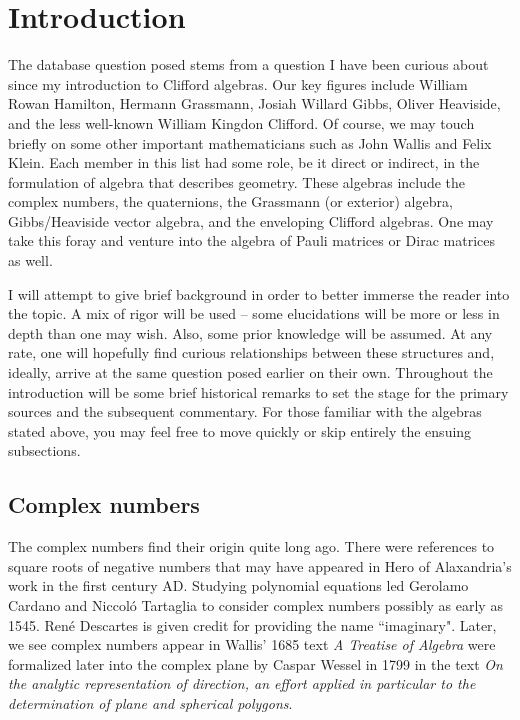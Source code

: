 \documentclass[12pt]{article}
\begin{document}
\section{Introduction}
The database question posed stems from a question I have been curious about since my introduction to Clifford algebras. Our key figures include William Rowan Hamilton, Hermann Grassmann, Josiah Willard Gibbs, Oliver Heaviside, and the less well-known William Kingdon Clifford. Of course, we may touch briefly on some other important mathematicians such as John Wallis and Felix Klein. Each member in this list had some role, be it direct or indirect, in the formulation of algebra that describes geometry. These algebras include the complex numbers, the quaternions, the Grassmann (or exterior) algebra, Gibbs/Heaviside vector algebra, and the enveloping Clifford algebras. One may take this foray and venture into the algebra of Pauli matrices or Dirac matrices as well.

I will attempt to give brief background in order to better immerse the reader into the topic. A mix of rigor will be used -- some elucidations will be more or less in depth than one may wish. Also, some prior knowledge will be assumed. At any rate, one will hopefully find curious relationships between these structures and, ideally, arrive at the same question posed earlier on their own. Throughout the introduction will be some brief historical remarks to set the stage for the primary sources and the subsequent commentary. For those familiar with the algebras stated above, you may feel free to move quickly or skip entirely the ensuing subsections. 

\subsection{Complex numbers}
The complex numbers find their origin quite long ago. There were references to square roots of negative numbers that may have appeared in Hero of Alaxandria's work in the first century AD. Studying polynomial equations led Gerolamo Cardano and Niccol\'o Tartaglia to consider complex numbers possibly as early as 1545. Ren\'e Descartes is given credit for providing the name ``imaginary". Later, we see complex numbers appear in Wallis' 1685 text \emph{A Treatise of Algebra} were formalized later into the complex plane by Caspar Wessel in 1799 in the text \emph{On the analytic representation of direction, an effort applied in particular to the determination of plane and spherical polygons}. 
\end{document}
